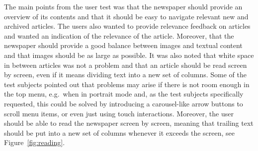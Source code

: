The main points from the user test was that the newspaper should provide an overview of its contents and that it should be easy to navigate relevant new and archived articles. The users also wanted to provide relevance feedback on articles and wanted an indication of the relevance of the article. Moreover, that the newspaper should provide a good balance between images and textual content and that images should be as large as possible. It was also noted that white space in between articles was not a problem and that an article should be read screen by screen, even if it means dividing text into a new set of columns. Some of the test subjects pointed out that problems may arise if there is not room enough in the top menu, e.g.\ when in portrait mode and, as the test subjects specifically requested, this could be solved by introducing a carousel-like arrow buttons to scroll menu items, or even just using touch interactions. Moreover, the user should be able to read the newspaper screen by screen, meaning that trailing text should be put into a new set of columns whenever it exceeds the screen, see Figure~\ref{fig:reading}.
